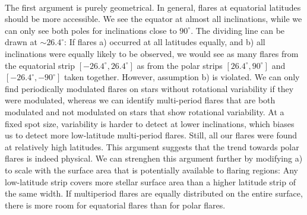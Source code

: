 \documentclass[fleqn,usenatbib,letters]{mnras}%
\begin{document}
\\
The first argument is purely geometrical. In general, flares at equatorial latitudes should be more accessible. We see the equator at almost all inclinations, while we can only see both poles for inclinations close to $90^\circ$. The dividing line can be drawn at $\sim 26.4^\circ$: If flares a) occurred at all latitudes equally, and b) all inclinations were equally likely to be observed, we would see as many flares from the equatorial strip $[-26.4^\circ, 26.4^\circ]$ as from the polar strips $[26.4^\circ, 90^\circ]$ and $[-26.4^\circ, -90^\circ]$ taken together. However, assumption b) is violated. We can only find periodically modulated flares on stars without rotational variability if they were modulated, whereas we can identify multi-period flares that are both modulated and not modulated on stars that show rotational variability. At a fixed spot size, variability is harder to detect at lower inclinations, which biases us to detect more low-latitude multi-period flares. Still, all our flares were found at relatively high latitudes. This argument suggests that the trend towards polar flares is indeed physical. We can strenghen this argument further by modifying a) to scale with the surface area that is potentially available to flaring regions: Any low-latitude strip covers more stellar surface area than a higher latitude strip of the same width. If multiperiod flares are equally distributed on the entire surface, there is more room for equatorial flares than for polar flares.
\\
\end{document}
